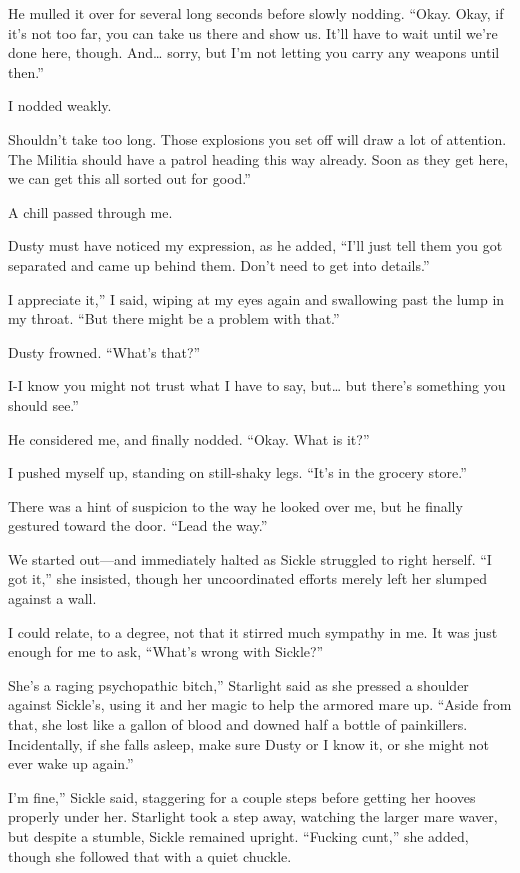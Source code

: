 He mulled it over for several long seconds before slowly nodding. “Okay. Okay, if it’s not too far, you can take us there and show us. It’ll have to wait until we’re done here, though. And… sorry, but I’m not letting you carry any weapons until then.”

I nodded weakly.

\leavevmode{}Shouldn’t take too long. Those explosions you set off will draw a lot of attention. The Militia should have a patrol heading this way already. Soon as they get here, we can get this all sorted out for good.”

A chill passed through me.

Dusty must have noticed my expression, as he added, “I’ll just tell them you got separated and came up behind them. Don’t need to get into details.”

\leavevmode{}I appreciate it,” I said, wiping at my eyes again and swallowing past the lump in my throat. “But there might be a problem with that.”

Dusty frowned. “What’s that?”

\leavevmode{}I-I know you might not trust what I have to say, but… but there’s something you should see.”

He considered me, and finally nodded. “Okay. What is it?”

I pushed myself up, standing on still-shaky legs. “It’s in the grocery store.”

There was a hint of suspicion to the way he looked over me, but he finally gestured toward the door. “Lead the way.”

We started out—and immediately halted as Sickle struggled to right herself. “I got it,” she insisted, though her uncoordinated efforts merely left her slumped against a wall.

I could relate, to a degree, not that it stirred much sympathy in me. It was just enough for me to ask, “What’s wrong with Sickle?”

\leavevmode{}She’s a raging psychopathic bitch,” Starlight said as she pressed a shoulder against Sickle’s, using it and her magic to help the armored mare up. “Aside from that, she lost like a gallon of blood and downed half a bottle of painkillers. Incidentally, if she falls asleep, make sure Dusty or I know it, or she might not ever wake up again.”

\leavevmode{}I’m fine,” Sickle said, staggering for a couple steps before getting her hooves properly under her. Starlight took a step away, watching the larger mare waver, but despite a stumble, Sickle remained upright. “Fucking cunt,” she added, though she followed that with a quiet chuckle.

